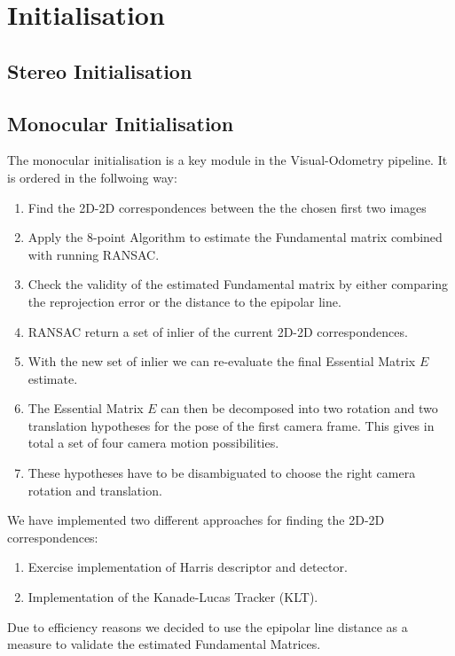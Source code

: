 \section{Initialisation}
\label{s:Initialisation}

\subsection{Stereo Initialisation}

\subsection{Monocular Initialisation}
The monocular initialisation is a key module in the Visual-Odometry pipeline.
It is ordered in the follwoing way:
\begin{enumerate}
	\item Find the 2D-2D correspondences between the the chosen first two images
	\item Apply the 8-point Algorithm to estimate the Fundamental matrix combined with running RANSAC.
	\item Check the validity of the estimated Fundamental matrix by either comparing the reprojection error or the distance to the epipolar line. 
	\item RANSAC return a set of inlier of the current 2D-2D correspondences.
	\item With the new set of inlier we can re-evaluate the final Essential Matrix $E$ estimate.
	\item The Essential Matrix $E$ can then be decomposed into two rotation and two translation hypotheses for the pose of the first camera frame. This gives in total a set of four camera motion possibilities.
	\item These hypotheses have to be disambiguated to choose the right camera rotation and translation.
\end{enumerate}

We have implemented two different approaches for finding the 2D-2D correspondences:

\begin{enumerate}
	\item Exercise implementation of Harris descriptor and detector.
	\item Implementation of the Kanade-Lucas Tracker (KLT).
\end{enumerate}

Due to efficiency reasons we decided to use the epipolar line distance as a measure to validate the estimated Fundamental Matrices.

